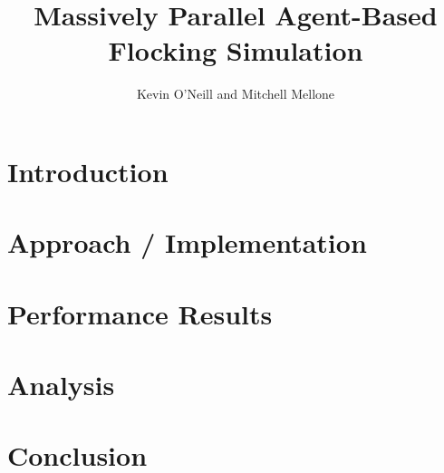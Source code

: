 \documentclass[10pt, twocolumn]{article}
\title{Massively Parallel Agent-Based Flocking Simulation}
\author{Kevin O'Neill and Mitchell Mellone}
\date{}
\begin{document}
\maketitle

\begin{abstract}
  
\end{abstract}

\section*{Introduction}


\section*{Approach / Implementation}


\section*{Performance Results}


\section*{Analysis}


\section*{Conclusion}


\printbibliography[title=References]
\end{document}
